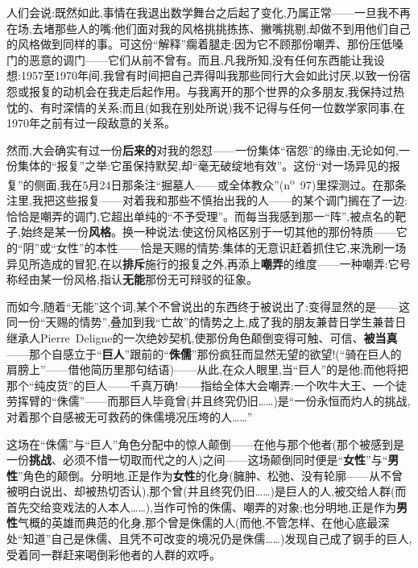 人们会说:既然如此,事情在我退出数学舞台之后起了变化,乃属正常——一旦我不再在场,去堵那些人的嘴:他们面对我的风格挑挑拣拣、撇嘴挑剔,却做不到用他们自己的风格做到同样的事。可这份“解释”瘸着腿走:因为它不顾那份嘲弄、那份压低嗓门的恶意的调门——它们从前不曾有。而且,凡我所知,没有任何东西能让我设想:1957至1970年间,我曾有时间把自己弄得叫我那些同行大会如此讨厌,以致一份宿怨或报复的动机会在我走后起作用。与我离开的那个世界的众多朋友,我保持过热忱的、有时深情的关系;而且(如我在别处所说)我不记得与任何一位数学家同事,在1970年之前有过一段敌意的关系。

然而,大会确实有过一份\textbf{后来的}对我的怨怼——一份集体“宿怨”的缘由,无论如何,一份集体的“报复”之举\dmark{}:它虽保持默契,却“毫无破绽地有效”。这份“对一场异见的报复”的侧面,我在5月24日那条注“掘墓人——或全体教众”(n\textsuperscript{o}~97)里探测过。在那条注里,我把这些报复——对着我和那些不慎抬出我的人——的某个调门搁在了一边:恰恰是嘲弄的调门,它超出单纯的“不予受理”。而每当我感到那一“阵”,被点名的靶子,始终是某一份\textbf{风格}。换一种说法:使这份风格区别于一切其他的那份特质——它的“阴”或“女性”的本性——恰是天赐的情势:集体的无意识赶着抓住它,来洗刷一场异见所造成的冒犯,在以\textbf{排斥}施行的报复之外,再添上\textbf{嘲弄}的维度——一种嘲弄:它号称经由某一份风格,指认\textbf{无能}那份无可辩驳的征象。

而如今,随着“无能”这个词,某个不曾说出的东西终于被说出了:变得显然的是——这同一份“天赐的情势”,叠加到我“亡故”的情势之上,成了我的朋友兼昔日学生兼昔日继承人Pierre~Deligne的一次绝妙契机,使那份角色颠倒变得可触、可信、\textbf{被当真}——那个自感立于“\textbf{巨人}”跟前的“\textbf{侏儒}”那份疯狂而显然无望的欲望!(“骑在巨人的肩膀上”——借他简历里那句结语)——从此,在众人眼里,当“巨人”的是他;而他将把那个“纯皮货”的巨人——千真万确!——指给全体大会嘲弄:一个吹牛大王、一个徒劳挥臂的“侏儒”——而那巨人毕竟曾(并且终究仍旧……)是“一份永恒而灼人的挑战,对着那个自感被无可救药的侏儒境况压垮的人……”

这场在“侏儒”与“巨人”角色分配中的惊人颠倒——在他与那个他者(那个被感到是一份\textbf{挑战}、必须不惜一切取而代之的人)之间——这场颠倒同时便是“\textbf{女性}”与“\textbf{男性}”角色的颠倒。分明地,正是作为\textbf{女性}的化身(臃肿、松弛、没有轮廓——从不曾被明白说出、却被热切否认),那个曾(并且终究仍旧……)是巨人的人,被交给\dmark{}人群(而首先交给变戏法的人本人……),当作可怜的侏儒、嘲弄的对象;也分明地,正是作为\textbf{男性}气概的英雄而典范的化身,那个曾是侏儒的人(而他,不管怎样、在他心底最深处“知道”自己是侏儒、且凭不可改变的境况仍是侏儒……)发现自己成了钢手的巨人,受着同一群赶来喝倒彩他者的人群的欢呼。

